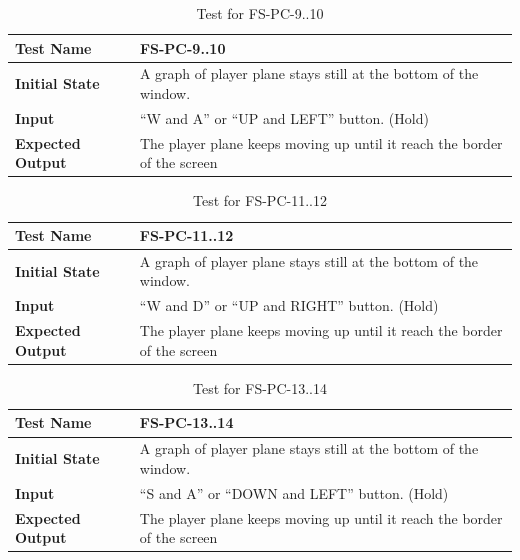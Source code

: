 \documentclass[12,english]{article}
\begin{document}
				\begin{table}[!htbp]
			
			\begin{tabularx}{\textwidth}{|l|X|}
				
				\hline
				
				\textbf{Test Name} & FS-PC-9..10
				\\ 
				\hline
				\textbf{Initial State} & A graph of player plane stays still at the bottom of the window. \\ 
				\hline
				\textbf{Input} & “W and A” or “UP and LEFT” button. (Hold)  \\ 
				\hline 
				\textbf{Expected Output} & The player plane keeps moving up until it reach the border of the screen \\ 
				\hline
				
			\end{tabularx}
			\caption{Test for FS-PC-9..10}
			\label{Table}
		\end{table}
				\begin{table}[!htbp]
			
			\begin{tabularx}{\textwidth}{|l|X|}
				
				\hline
				
				\textbf{Test Name} & FS-PC-11..12
				\\ 
				\hline
				\textbf{Initial State} & A graph of player plane stays still at the bottom of the window. \\ 
				\hline
				\textbf{Input} & “W and D” or “UP and RIGHT” button. (Hold)  \\ 
				\hline 
				\textbf{Expected Output} & The player plane keeps moving up until it reach the border of the screen \\ 
				\hline
				
			\end{tabularx}
			\caption{Test for FS-PC-11..12}
			\label{Table}
		\end{table}
				\begin{table}[!htbp]
			
			\begin{tabularx}{\textwidth}{|l|X|}
				
				\hline
				
				\textbf{Test Name} & FS-PC-13..14
				\\ 
				\hline
				\textbf{Initial State} & A graph of player plane stays still at the bottom of the window. \\ 
				\hline
				\textbf{Input} & “S and A” or “DOWN and LEFT” button. (Hold)  \\ 
				\hline 
				\textbf{Expected Output} & The player plane keeps moving up until it reach the border of the screen \\ 
				\hline
				
			\end{tabularx}
			\caption{Test for FS-PC-13..14}
			\label{Table}
		\end{table}
\end{document}
